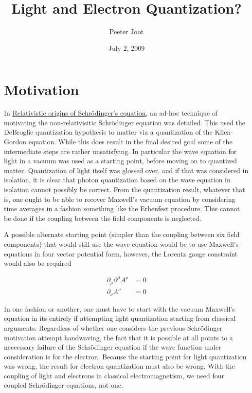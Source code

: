 \documentclass[]{eliblog}
\title{Light and Electron Quantization?}
\author{Peeter Joot}
\date{July 2, 2009}
\begin{document}
\maketitle{}
\tableofcontents
\section{Motivation}

In \href{http://sites.google.com/site/peeterjoot/math2009/relwave.pdf}{Relativistic origins of Schr\"odinger's equation}, an ad-hoc technique of motivating the non-relativisitic Schr\"odinger equation was detailed.  This used the DeBroglie quantization hypothesis to matter via a quantization of the Klien-Gordon equation.  While this  does result in the final desired goal some of the intermediate steps are rather unsatisfying.  In particular the wave equation for light in a vacuum was used as a starting point, before moving on to quantized matter.  Quantization of light itself was glossed over, and if that was considered in isolation, it is clear that photon quantization based on the wave equation in isolation cannot possibly be correct.  From the quantization result, whatever that is, one ought to be able to recover Maxwell's vacuum equation by considering time averages in a fashion something like the Erhenfest procedure.  This cannot be done if the coupling between the field components is neglected.

A possible alternate starting point (simpler than the coupling between six field components) that would still use the wave equation would be to use Maxwell's equations in four vector potential form, however, the Lorentz gauge constraint would also be required

\begin{align}\label{eqn:maxwellPotVacuum}
\partial_\mu \partial^\mu A^\nu &= 0 \\
\partial_\nu A^\nu &= 0
\end{align}

In one fashion or another, one must have to start with the vacuum Maxwell's equation in its entirely if attempting light quantization starting from classical arguments.  Regardless of whether one considers the previous Schr\"odinger motivation attempt handwaving, the fact that it is possible at all points to a neccessary failure of the Schr\"odinger equation if the wave function under consideration is for the electron.  Because the starting point for light quantization was wrong, the result for electron quantization must also be wrong.  With the coupling of light and electrons in classical electromagnetism, we need four coupled Schr\"odinger equations, not one.
\end{document}
